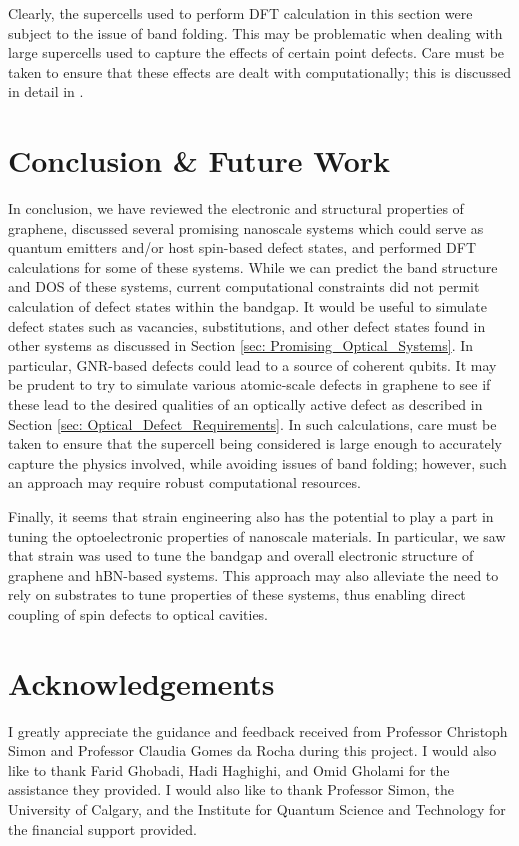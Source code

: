 \documentclass[]{article}
\begin{document}
Clearly, the supercells used to perform DFT calculation in this section were subject to the issue of band folding. This may be problematic when dealing with large supercells used to capture the effects of certain point defects. Care must be taken to ensure that these effects are dealt with computationally; this is discussed in detail in \cite{Band_unfolding}.

\section{Conclusion \& Future Work}

In conclusion, we have reviewed the electronic and structural properties of graphene, discussed several promising nanoscale systems which could serve as quantum emitters and/or host spin-based defect states, and performed DFT calculations for some of these systems. While we can predict the band structure and DOS of these systems, current computational constraints did not permit calculation of defect states within the bandgap. It would be useful to simulate defect states such as vacancies, substitutions, and other defect states found in other systems as discussed in Section \ref{sec: Promising_Optical_Systems}. In particular, GNR-based defects could lead to a source of coherent qubits. It may be prudent to try to simulate various atomic-scale defects in graphene to see if these lead to the desired qualities of an optically active defect as described in Section \ref{sec: Optical_Defect_Requirements}. In such calculations, care must be taken to ensure that the supercell being considered is large enough to accurately capture the physics involved, while avoiding issues of band folding; however, such an approach may require robust computational resources.
\newline

Finally, it seems that strain engineering also has the potential to play a part in tuning the optoelectronic properties of nanoscale materials. In particular, we saw that strain was used to tune the bandgap and overall electronic structure of graphene and hBN-based systems. This approach may also alleviate the need to rely on substrates to tune properties of these systems, thus enabling direct coupling of spin defects to optical cavities.


\section{Acknowledgements}
I greatly appreciate the guidance and feedback received from Professor Christoph Simon and Professor Claudia Gomes da Rocha during this project. I would also like to thank Farid Ghobadi, Hadi Haghighi, and Omid Gholami for the assistance they provided. I would also like to thank Professor Simon, the University of Calgary, and the Institute for Quantum Science and Technology for the financial support provided. 
\end{document}
